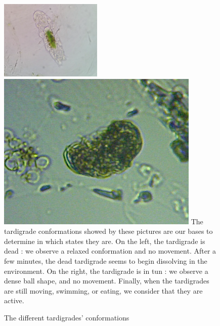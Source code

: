 \documentclass[12pt,a4paper, twocolumn]{article}
\begin{document}
\setcounter{figure}{0}
\begin{figure}
\includegraphics[width=\linewidth]{dead.png}
\includegraphics[width=\linewidth]{tun.png}
The tardigrade conformations showed by these pictures are our bases to determine in which states they are. On the left, the tardigrade is dead : we observe a relaxed conformation and no movement. After a few minutes, the dead tardigrade seems to begin dissolving in the environment. On the right, the tardigrade is in tun : we observe a dense ball shape, and no movement. Finally, when the tardigrades are still moving, swimming, or eating, we consider that they are active.
\label{dead-tun}
\caption{The different tardigrades' conformations}
\end{figure}
\end{document}
